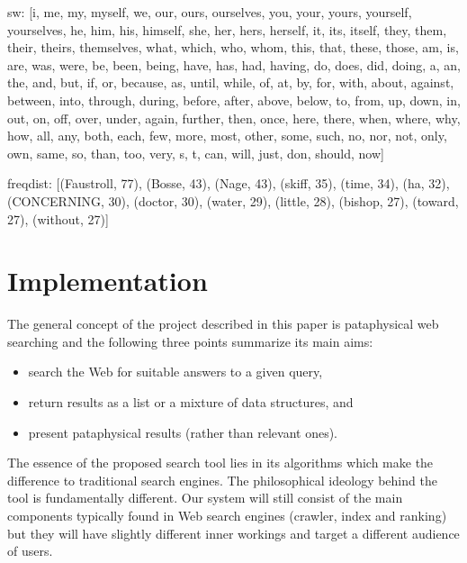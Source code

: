 sw:
[i, me, my, myself, we, our, ours, ourselves, you, your, yours, yourself, yourselves, he, him, his, himself, she, her, hers, herself, it, its, itself, they, them, their, theirs, themselves, what, which, who, whom, this, that, these, those, am, is, are, was, were, be, been, being, have, has, had, having, do, does, did, doing, a, an, the, and, but, if, or, because, as, until, while, of, at, by, for, with, about, against, between, into, through, during, before, after, above, below, to, from, up, down, in, out, on, off, over, under, again, further, then, once, here, there, when, where, why, how, all, any, both, each, few, more, most, other, some, such, no, nor, not, only, own, same, so, than, too, very, s, t, can, will, just, don, should, now]

freqdist:
[(Faustroll, 77), (Bosse, 43), (Nage, 43), (skiff, 35), (time, 34), (ha, 32),  (CONCERNING, 30), (doctor, 30), (water, 29), (little, 28), (bishop, 27), (toward, 27), (without, 27)]





\section{Implementation}

The general concept of the project described in this paper is pataphysical web searching and the following three points summarize its main aims:

\begin{itemize}
  \item search the Web for suitable answers to a given query,
  \item return results as a list or a mixture of data structures, and
  \item present pataphysical results (rather than relevant ones).
\end{itemize}

The essence of the proposed search tool lies in its algorithms which make the difference to traditional search engines. The philosophical ideology behind the tool is fundamentally different. Our system will still consist of the main components typically found in Web search engines (crawler, index and ranking) but they will have slightly different inner workings and target a different audience of users.

